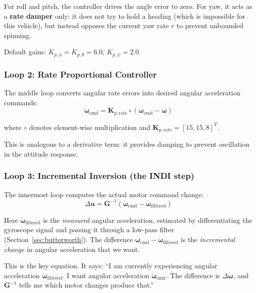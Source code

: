 \documentclass[12pt, a4paper]{article}
\newcommand{\bu}{\bm{u}}
\newcommand{\bomega}{\bm{\omega}}
\begin{document}
For roll and pitch, the controller drives the angle error to zero.  For yaw, it acts as a \textbf{rate damper} only: it does not try to hold a heading (which is impossible for this vehicle), but instead opposes the current yaw rate $r$ to prevent unbounded spinning.

Default gains: $K_{p,\phi} = K_{p,\theta} = 6.0$, $K_{p,\psi} = 2.0$.

\subsubsection{Loop 2: Rate Proportional Controller}

The middle loop converts angular rate errors into desired angular acceleration commands:
\begin{equation}
    \dot{\bomega}_{\text{cmd}} = \bm{K}_{p,\text{rate}} \circ (\bomega_{\text{cmd}} - \bomega)
\end{equation}

where $\circ$ denotes element-wise multiplication and $\bm{K}_{p,\text{rate}} = [15, 15, 8]^T$.

This is analogous to a derivative term: it provides damping to prevent oscillation in the attitude response.

\subsubsection{Loop 3: Incremental Inversion (the INDI step)}

The innermost loop computes the actual motor command change:
\begin{equation}
    \boxed{
    \Delta\bu = \bm{G}^{-1} \left( \dot{\bomega}_{\text{cmd}} - \dot{\bomega}_{\text{filtered}} \right)
    }
    \label{eq:indi_law}
\end{equation}

Here $\dot{\bomega}_{\text{filtered}}$ is the \emph{measured} angular acceleration, estimated by differentiating the gyroscope signal and passing it through a low-pass filter (Section~\ref{sec:butterworth}).  The difference $\dot{\bomega}_{\text{cmd}} - \dot{\bomega}_{\text{filtered}}$ is the \emph{incremental change} in angular acceleration that we want.

This is the key equation.  It says: ``I am currently experiencing angular acceleration $\dot{\bomega}_{\text{filtered}}$.  I want angular acceleration $\dot{\bomega}_{\text{cmd}}$.  The difference is $\Delta\dot{\bomega}$, and $\bm{G}^{-1}$ tells me which motor changes produce that.''
\end{document}
